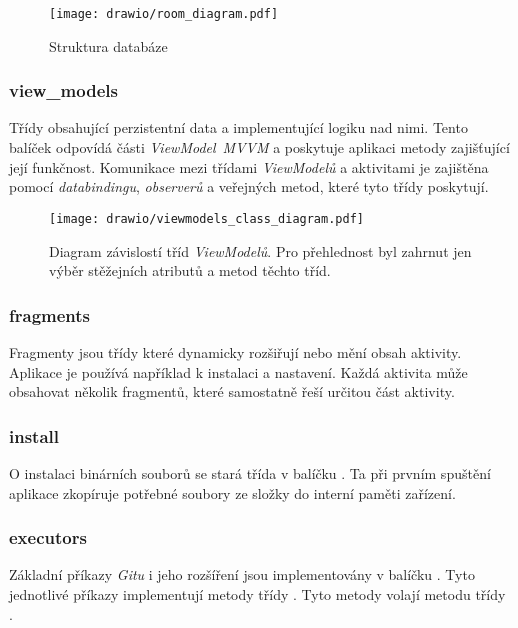     \begin{figure}[h]
        \centering
        \vspace{0.5cm}
        \texttt{[image: drawio/room\_diagram.pdf]}
        \caption[Struktura databáze]{Struktura databáze~\cite{room-structure}}
        \label{diagram:packages}
    \end{figure}

    \subsubsection{view\_models}
    Třídy obsahující perzistentní data a implementující logiku nad nimi. Tento balíček odpovídá části \emph{ViewModel}~\emph{MVVM} a poskytuje aplikaci metody zajišťující její funkčnost. Komunikace mezi třídami \emph{ViewModelů} a aktivitami je zajištěna pomocí \emph{databindingu}, \emph{observerů} a veřejných metod, které tyto třídy poskytují.

    \begin{figure}[h]
        \centering
        \vspace{0.5cm}
        \texttt{[image: drawio/viewmodels\_class\_diagram.pdf]}
        \caption[Diagram závislostí tříd ViewModelů]{Diagram závislostí tříd \emph{ViewModelů}. Pro přehlednost byl zahrnut jen výběr stěžejních atributů a metod těchto tříd.}
        \label{diagram:view_models}
    \end{figure}

    \newpage
    \subsubsection{fragments}
    Fragmenty jsou třídy které dynamicky rozšiřují nebo mění obsah aktivity. Aplikace je používá například k instalaci a nastavení. Každá aktivita může obsahovat několik fragmentů, které samostatně řeší určitou část aktivity.

    \subsubsection{install}
    O instalaci binárních souborů se stará třída  v balíčku . Ta při prvním spuštění aplikace zkopíruje potřebné soubory ze složky  do interní paměti zařízení.

    \subsubsection{executors}
    Základní příkazy \emph{Gitu} i jeho rozšíření jsou implementovány v balíčku . Tyto jednotlivé příkazy implementují metody třídy . Tyto metody volají metodu  třídy .

